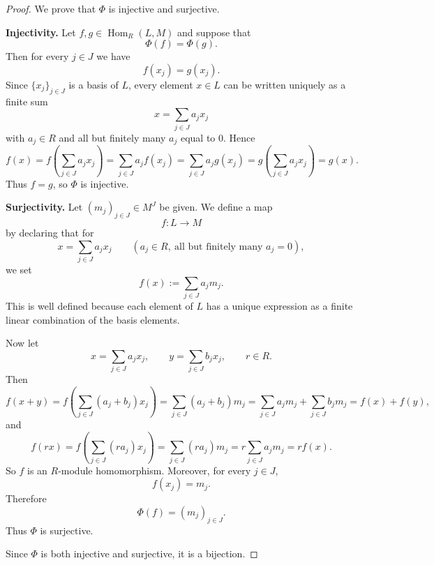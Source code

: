 \begin{proof}
    We prove that $\Phi$ is injective and surjective.

    \medskip
    \noindent\textbf{Injectivity.}
    Let $f,g\in \operatorname{Hom}_R(L,M)$ and suppose that
    \[
        \Phi(f)=\Phi(g).
    \]
    Then for every $j\in J$ we have
    \[
        f(x_j)=g(x_j).
    \]
    Since $\{x_j\}_{j\in J}$ is a basis of $L$, every element $x\in L$ can be written uniquely as a finite sum
    \[
        x=\sum_{j\in J} a_j x_j
    \]
    with $a_j\in R$ and all but finitely many $a_j$ equal to $0$. Hence
    \[
        f(x)=f\!\left(\sum_{j\in J} a_j x_j\right)
        =\sum_{j\in J} a_j f(x_j)
        =\sum_{j\in J} a_j g(x_j)
        =g\!\left(\sum_{j\in J} a_j x_j\right)
        =g(x).
    \]
    Thus $f=g$, so $\Phi$ is injective.

    \medskip
    \noindent\textbf{Surjectivity.}
    Let $(m_j)_{j\in J}\in M^J$ be given. We define a map
    \[
        f:L\to M
    \]
    by declaring that for
    \[
        x=\sum_{j\in J} a_j x_j \qquad (a_j\in R,\ \text{all but finitely many } a_j=0),
    \]
    we set
    \[
        f(x):=\sum_{j\in J} a_j m_j.
    \]
    This is well defined because each element of $L$ has a unique expression as a finite linear combination of the basis elements.

    Now let
    \[
        x=\sum_{j\in J} a_j x_j,\qquad
        y=\sum_{j\in J} b_j x_j,\qquad
        r\in R.
    \]
    Then
    \[
        f(x+y)
        =f\!\left(\sum_{j\in J} (a_j+b_j)x_j\right)
        =\sum_{j\in J}(a_j+b_j)m_j
        =\sum_{j\in J}a_jm_j+\sum_{j\in J}b_jm_j
        =f(x)+f(y),
    \]
    and
    \[
        f(rx)
        =f\!\left(\sum_{j\in J} (ra_j)x_j\right)
        =\sum_{j\in J} (ra_j)m_j
        =r\sum_{j\in J} a_jm_j
        =rf(x).
    \]
    So $f$ is an $R$-module homomorphism. Moreover, for every $j\in J$,
    \[
        f(x_j)=m_j.
    \]
    Therefore
    \[
        \Phi(f)=(m_j)_{j\in J}.
    \]
    Thus $\Phi$ is surjective.

    Since $\Phi$ is both injective and surjective, it is a bijection.
\end{proof}

